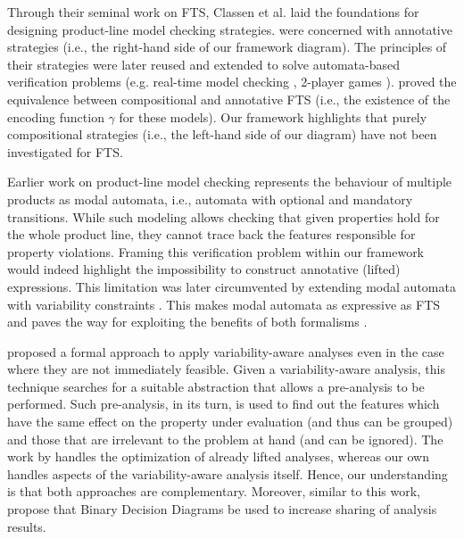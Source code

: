 Through their seminal work on FTS, Classen et al. \cite{Classen2013,Classen2014} laid the foundations for designing product-line model checking strategies.
\citet{Classen2013} were concerned with annotative strategies (i.e., the right-hand side of our framework diagram). The principles of their strategies were later reused and extended to solve automata-based verification problems (e.g. real-time model checking \cite{Cordy2013}, 2-player games \cite{Greenyer2013b}).
\citet{Classen2014} proved the equivalence between compositional and annotative FTS (i.e., the existence of the encoding function $\gamma$ for these models). Our framework highlights that purely compositional strategies (i.e., the left-hand side of our diagram) have not been investigated for FTS.

Earlier work on product-line model checking \cite{Fantechi2008} represents the behaviour of multiple products as modal automata, i.e., automata with optional and mandatory transitions. While such modeling allows checking that given properties hold for the whole product line, they cannot trace back the features responsible for property violations. Framing this verification problem within our framework would indeed highlight the impossibility to construct annotative (lifted) expressions. This limitation was later circumvented by extending modal automata with variability constraints \cite{Asirelli2011,TerBeek2016}. This makes modal automata as expressive as FTS \cite{TerBeek2015,TerBeek2019} and paves the way for exploiting the benefits of both formalisms \cite{Varshosaz2019}.


\citet{Dimovski2019} proposed a formal approach to apply variability-aware analyses even
in the case where they are not immediately feasible.
Given a variability-aware analysis, this technique searches for a suitable abstraction
that allows a pre-analysis to be performed.
Such pre-analysis, in its turn, is used to find out the features which have the same effect on
the property under evaluation (and thus can be grouped) and those that are irrelevant to the
problem at hand (and can be ignored).
The work by \citet{Dimovski2019} handles the optimization of already lifted analyses, whereas
our own handles aspects of the variability-aware analysis itself.
Hence, our understanding is that both approaches are complementary.
Moreover, similar to this work, \citet{Dimovski2019} propose that Binary Decision Diagrams
be used to increase sharing of analysis results.

